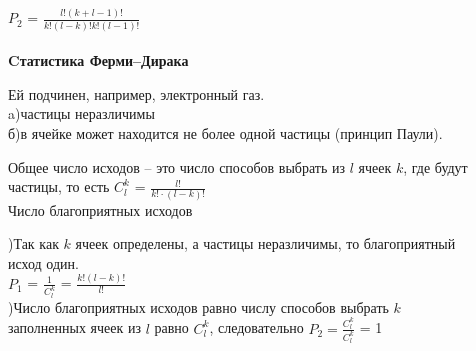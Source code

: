 \documentclass[russian, 12pt, fleqn]{article}
\begin{document}
$P_2$ = $\frac{l!(k + l - 1)!}{k!(l - k)!k!(l - 1)!}$ \\
\\
\textbf{Cтатистика Ферми--Дирака}
\begin{tabbing}
Ей подчинен, например, электронный газ.\\
\qquad a)частицы неразличимы\\
\qquad б)в ячейке может находится не более одной частицы (принцип Паули).
\end{tabbing}
Общее число исходов -- это число способов выбрать из $l$ ячеек $k$, где будут частицы, то есть $C^k_l$ = $\frac{l!}{k!\cdot(l - k)!}$\\
Число благоприятных исходов
\begin{tabbing}	
)Так как $k$  ячеек определены, а частицы неразличимы, то благоприятный\\ исход один.\\$P_1$ = $\frac{1}{C^k_l}$ = $\frac{k!(l - k)!}{l!}$\\
)Число благоприятных исходов равно числу способов выбрать $k$\\
 заполненных ячеек из $l$  равно $C^k_l$, следовательно $P_2 = \frac{C^k_l}{C^k_l}$ = 1
\end{tabbing}
\end{document}
